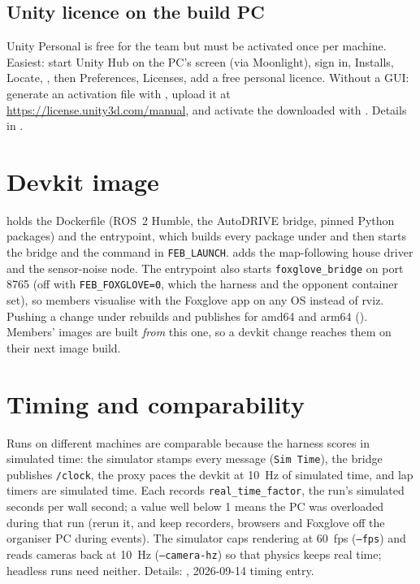 \documentclass[11pt,a4paper]{article}
\begin{document}
\subsection{Unity licence on the build PC}

Unity Personal is free for the team but must be activated once per machine. Easiest: start
Unity Hub on the PC's screen (via Moonlight), sign in, Installs, Locate,
, then Preferences, Licenses, add
a free personal licence. Without a GUI: generate an activation file with
, upload it at
\url{https://license.unity3d.com/manual}, and activate the downloaded  with
. Details in .

\section{Devkit image}

 holds the Dockerfile (ROS~2 Humble, the AutoDRIVE bridge, pinned Python
packages) and the entrypoint, which builds every package under  and then starts
the bridge and the command in \texttt{FEB\_LAUNCH}.  adds the map-following
house driver and the sensor-noise node. The entrypoint also starts \texttt{foxglove\_bridge}
on port 8765 (off with \texttt{FEB\_FOXGLOVE=0}, which the harness and the opponent container
set), so members visualise with the Foxglove app on any OS instead of rviz. Pushing a change under  rebuilds and
publishes  for amd64 and arm64
(). Members' images are built \emph{from} this one, so a
devkit change reaches them on their next image build.

\section{Timing and comparability}

Runs on different machines are comparable because the harness scores in simulated time: the
simulator stamps every message (\texttt{Sim Time}), the bridge publishes \texttt{/clock},
the proxy paces the devkit at 10~Hz of simulated time, and lap timers are simulated time.
Each  records \texttt{real\_time\_factor}, the run's simulated seconds per
wall second; a value well below 1 means the PC was overloaded during that run (rerun it, and
keep recorders, browsers and Foxglove off the organiser PC during events). The simulator caps
rendering at 60~fps (\texttt{--fps}) and reads cameras back at 10~Hz (\texttt{--camera-hz}) so
that physics keeps real time; headless runs need neither. Details: ,
2026-09-14 timing entry.
\end{document}
